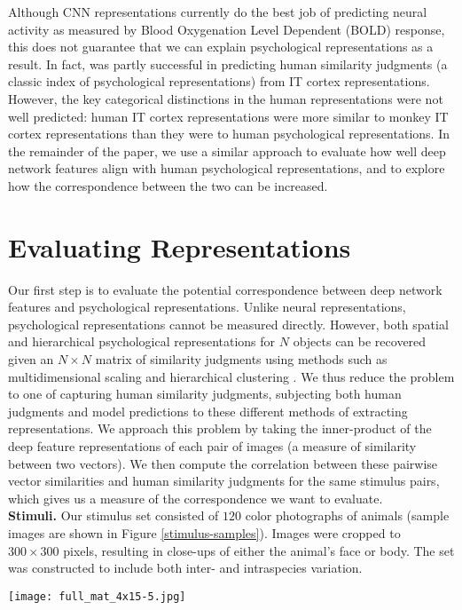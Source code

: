 \documentclass[10pt,letterpaper]{article}
\begin{document}
Although CNN representations currently do the best job of predicting neural activity as measured by Blood Oxygenation Level Dependent (BOLD) response, this does not guarantee that we can explain psychological representations as a result. In fact, \cite*{mur_human_2013} was partly successful in predicting human similarity judgments (a classic index of psychological representations) from IT cortex representations. However, the key categorical distinctions in the human representations were not well predicted: human IT cortex representations were more similar to monkey IT cortex representations than they were to human psychological representations. In the remainder of the paper, we use a similar approach to evaluate how well deep network features align with human psychological representations, and to explore how the correspondence between the two can be increased.

\section{Evaluating Representations}
Our first step is to evaluate the potential correspondence between deep network features and psychological representations. Unlike neural representations, psychological representations cannot be measured directly. However, both spatial and hierarchical psychological representations for $N$ objects can be recovered given an $N \times N$ matrix of similarity judgments using methods such as multidimensional scaling and hierarchical clustering \citep*{shepard1980multidimensional}. We thus reduce the problem to one of capturing human similarity judgments, subjecting both human judgments and model predictions to these different methods of extracting representations. We approach this problem by taking the inner-product of the deep feature representations of each pair of images (a measure of similarity between two vectors). We then compute the correlation between these pairwise vector similarities and human similarity judgments for the same stimulus pairs, which gives us a measure of the correspondence we want to evaluate.\\

\noindent \textbf{Stimuli.} Our stimulus set consisted of $120$ color photographs of animals (sample images are shown in Figure \ref{stimulus-samples}). Images were cropped to $300\times300$ pixels, resulting in close-ups of either the animal's face or body. The set was constructed to include both inter- and intraspecies variation.\\
%
%
\begin{figure*}[!ht]
\begin{center}
\texttt{[image: full\_mat\_4x15-5.jpg]}
\end{center}
\vspace{-5px}
\caption{Samples from the set of $120$ animal photographs.}
\label{stimulus-samples}
\end{figure*}
\end{document}
